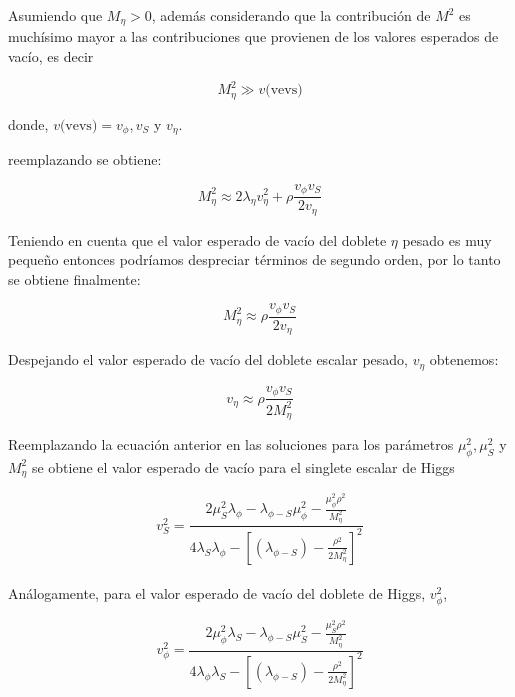 \documentclass[12pt]{article}
\begin{document}
Asumiendo que $ M_\eta >0 $, además considerando que  la contribución de $M^{2}$ es muchísimo mayor a las contribuciones que provienen de los valores esperados de vacío, es decir 

 \[  M^{2}_\eta  \gg v\text{(vevs)}  \]

donde, $v\text{(vevs)} = v_\phi, v_S $ y $v_\eta$. 

reemplazando se obtiene: 


 \begin{equation}
      \label{eq:mass22}
      M^{2}_\eta  \approx 2\lambda_\eta v^{2}_\eta + \rho \frac{v_\phi v_S }{2v_\eta}
 \end{equation}

Teniendo en cuenta que el valor esperado de vacío del doblete $\eta$ pesado es muy pequeño entonces podríamos despreciar términos de segundo orden, por lo tanto se obtiene finalmente: 


 \begin{equation}
      \label{eq:mass2prim2}
      M^{2}_\eta  \approx  \rho \frac{v_\phi v_S }{2v_\eta}
 \end{equation}

Despejando el valor esperado de vacío del doblete escalar pesado, $v_\eta$ obtenemos:

 \begin{equation}
      \label{eq:ma1s2}
      v_\eta  \approx  \rho \frac{v_\phi v_S }{2M^{2}_\eta}
 \end{equation}

Reemplazando la ecuación anterior en las soluciones para los parámetros   $ \mu^{2}_\phi, \mu^{2}_S $ y $M^{2}_\eta$ se obtiene el valor esperado de vacío para el singlete escalar de Higgs

\begin{equation}
    \label{eq:valoresperadoS}
    v^{2}_S= \frac{2\mu^{2}_S\lambda_\phi-{\lambda_{\phi-S}}\mu^{2}_\phi-\frac{\mu^{2}_\phi\rho^{2}}{M^{2}_\eta}}{4\lambda_S\lambda_\phi-[({\lambda_{\phi-S}})-\frac{\rho^{2}}{2M^{2}_\eta}]^{2}} 
\end{equation} \\

Análogamente, para el valor esperado de vacío del doblete de Higgs, $v_\phi^{2}$, 

\begin{equation}
    \label{eq:valoresperadoPHI}
    v^{2}_\phi= \frac{2\mu^{2}_\phi\lambda_S-{\lambda_{\phi-S}}\mu^{2}_S-\frac{\mu^{2}_S\rho^{2}}{M^{2}_\eta}}{4\lambda_\phi\lambda_S-[({\lambda_{\phi-S}})-\frac{\rho^{2}}{2M^{2}_\eta}]^{2}} 
\end{equation} \\
\end{document}
